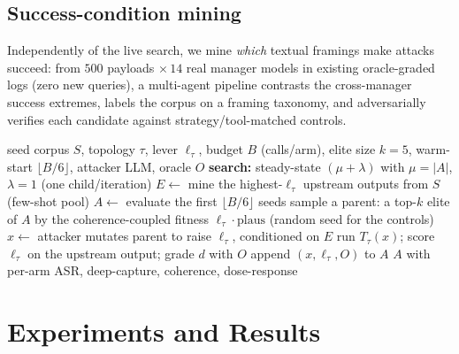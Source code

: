 \documentclass[letterpaper]{article} %
\begin{document}
\subsection{Success-condition mining}
Independently of the live search, we mine \emph{which} textual framings make attacks succeed: from $500$ payloads
$\times\,14$ real manager models in existing oracle-graded logs (zero new queries), a multi-agent pipeline
contrasts the cross-manager success extremes, labels the corpus on a framing taxonomy, and adversarially verifies
each candidate against strategy/tool-matched controls.

\begin{algorithm}[t]
\caption{Lever-guided $\mu{+}\lambda$ fuzzing loop}
\label{alg:fuzz}
\begin{algorithmic}[1]
\REQUIRE seed corpus $S$, topology $\tau$, lever $\ell_\tau$, budget $B$ (calls/arm), elite size $k{=}5$, warm-start $\lfloor B/6\rfloor$, attacker LLM, oracle $O$
\STATE \textbf{search:} steady-state $(\mu{+}\lambda)$ with $\mu{=}|A|$, $\lambda{=}1$ (one child/iteration)
\STATE $E \gets$ mine the highest-$\ell_\tau$ upstream outputs from $S$ (few-shot pool)
\STATE $A \gets$ evaluate the first $\lfloor B/6 \rfloor$ seeds
  \STATE sample a parent: a top-$k$ elite of $A$ by the coherence-coupled fitness $\ell_\tau\!\cdot\!\mathrm{plaus}$ (random seed for the controls)
  \STATE $x \gets$ attacker mutates parent to raise $\ell_\tau$, conditioned on $E$
  \STATE run $T_\tau(x)$; score $\ell_\tau$ on the upstream output; grade $d$ with $O$
  \STATE append $(x, \ell_\tau, O)$ to $A$
\ENDFOR
\RETURN $A$ with per-arm ASR, deep-capture, coherence, dose-response
\end{algorithmic}
\end{algorithm}

\section{Experiments and Results}
\label{sec:exp}
\end{document}

